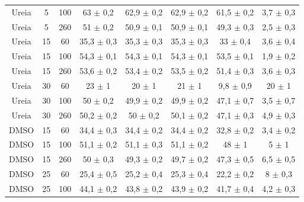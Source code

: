 \begin{table}[h]
\begin{adjustbox}{angle=90}
{\begin{tabular}{c c c | c c c c c}
			  Ureia   & 5          & 100        & 63      \(\pm\) 0,2 & 62,9     \(\pm\) 0,2 & 62,9     \(\pm\) 0,2 & 61,5        \(\pm\) 0,2 & 3,7         \(\pm\) 0,3 \\
			  Ureia   & 5          & 260        & 51      \(\pm\) 0,2 & 50,9     \(\pm\) 0,1 & 50,9     \(\pm\) 0,1 & 49,3        \(\pm\) 0,3 & 2,5         \(\pm\) 0,3 \\ 
			  Ureia   & 15         & 60         & 35,3    \(\pm\) 0,3 & 35,3     \(\pm\) 0,3 & 35,3     \(\pm\) 0,3 & 33          \(\pm\) 0,4 & 3,6         \(\pm\) 0,4 \\
			  Ureia   & 15         & 100        & 54,3    \(\pm\) 0,1 & 54,3     \(\pm\) 0,1 & 54,3     \(\pm\) 0,1 & 53,5        \(\pm\) 0,1 & 1,9         \(\pm\) 0,2 \\
			  Ureia   & 15         & 260        & 53,6    \(\pm\) 0,2 & 53,4     \(\pm\) 0,2 & 53,5     \(\pm\) 0,2 & 51,4        \(\pm\) 0,3 & 3,6         \(\pm\) 0,3 \\ 
			  Ureia   & 30         & 60         & 23      \(\pm\) 1   & 20       \(\pm\) 1   & 21       \(\pm\) 1   & 9,8         \(\pm\) 0,9 & 20          \(\pm\) 1   \\
			  Ureia   & 30         & 100        & 50      \(\pm\) 0,2 & 49,9     \(\pm\) 0,2 & 49,9     \(\pm\) 0,2 & 47,1        \(\pm\) 0,7 & 3,5         \(\pm\) 0,7 \\
			  Ureia   & 30         & 260        & 50,2    \(\pm\) 0,2 & 50       \(\pm\) 0,2 & 50,1     \(\pm\) 0,2 & 47,1        \(\pm\) 0,3 & 4,9         \(\pm\) 0,3 \\  \midrule
			  DMSO    & 15         & 60         & 34,4    \(\pm\) 0,3 & 34,4     \(\pm\) 0,2 & 34,4     \(\pm\) 0,2 & 32,8        \(\pm\) 0,2 & 3,4         \(\pm\) 0,2 \\
			  DMSO    & 15         & 100        & 51,1    \(\pm\) 0,2 & 51,1     \(\pm\) 0,3 & 51,1     \(\pm\) 0,2 & 48          \(\pm\) 1   & 5           \(\pm\) 1   \\
			  DMSO    & 15         & 260        & 50      \(\pm\) 0,3 & 49,3     \(\pm\) 0,2 & 49,7     \(\pm\) 0,2 & 47,3        \(\pm\) 0,5 & 6,5         \(\pm\) 0,5 \\ 
			  DMSO    & 25         & 60         & 25,4    \(\pm\) 0,5 & 25,2     \(\pm\) 0,4 & 25,3     \(\pm\) 0,4 & 22,2        \(\pm\) 0,2 & 8           \(\pm\) 0,3 \\
			  DMSO    & 25         & 100        & 44,1    \(\pm\) 0,2 & 43,8     \(\pm\) 0,2 & 43,9     \(\pm\) 0,2 & 41,7        \(\pm\) 0,4 & 4,2         \(\pm\) 0,3 \\

\end{tabular}}
\end{adjustbox}
\end{table}
